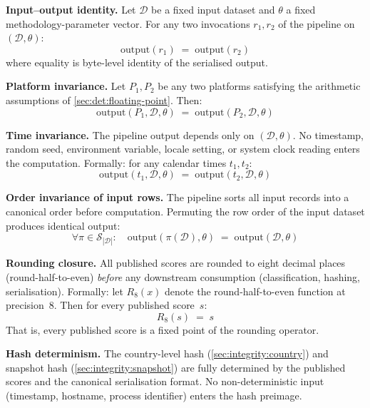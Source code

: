 \begin{description}[style=nextline, leftmargin=3.5em, labelwidth=3em]

  \item[\textbf{D-1}] \textbf{Input--output identity.}\enspace
    Let \(\mathcal{D}\) be a fixed input dataset and \(\theta\) a fixed
    methodology-parameter vector.  For any two invocations \(r_1, r_2\) of
    the pipeline on \((\mathcal{D}, \theta)\):
    \[
      \mathrm{output}(r_1) \;=\; \mathrm{output}(r_2)
    \]
    where equality is byte-level identity of the serialised output.

  \item[\textbf{D-2}] \textbf{Platform invariance.}\enspace
    Let \(P_1, P_2\) be any two platforms satisfying the arithmetic
    assumptions of \cref{sec:det:floating-point}.  Then:
    \[
      \mathrm{output}(P_1, \mathcal{D}, \theta)
      \;=\;
      \mathrm{output}(P_2, \mathcal{D}, \theta)
    \]

  \item[\textbf{D-3}] \textbf{Time invariance.}\enspace
    The pipeline output depends only on \((\mathcal{D}, \theta)\).  No
    timestamp, random seed, environment variable, locale setting, or
    system clock reading enters the computation.  Formally: for any
    calendar times \(t_1, t_2\):
    \[
      \mathrm{output}(t_1, \mathcal{D}, \theta)
      \;=\;
      \mathrm{output}(t_2, \mathcal{D}, \theta)
    \]

  \item[\textbf{D-4}] \textbf{Order invariance of input rows.}\enspace
    The pipeline sorts all input records into a canonical order before
    computation.  Permuting the row order of the input dataset produces
    identical output:
    \[
      \forall \pi \in \mathcal{S}_{|\mathcal{D}|}:\quad
      \mathrm{output}(\pi(\mathcal{D}), \theta)
      \;=\;
      \mathrm{output}(\mathcal{D}, \theta)
    \]

  \item[\textbf{D-5}] \textbf{Rounding closure.}\enspace
    All published scores are rounded to eight decimal places
    (round-half-to-even) \emph{before} any downstream consumption
    (classification, hashing, serialisation).  Formally: let \(R_8(x)\)
    denote the round-half-to-even function at precision~8.  Then for every
    published score~\(s\):
    \[
      R_8(s) \;=\; s
    \]
    That is, every published score is a fixed point of the rounding operator.

  \item[\textbf{D-6}] \textbf{Hash determinism.}\enspace
    The country-level hash (\cref{sec:integrity:country}) and snapshot hash
    (\cref{sec:integrity:snapshot}) are fully determined by the published
    scores and the canonical serialisation format.  No non-deterministic
    input (timestamp, hostname, process identifier) enters the hash
    preimage.


\end{description}
